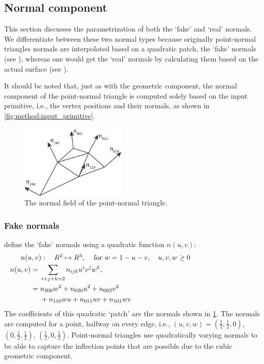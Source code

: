 
\subsection{Normal component}\label{ss:normal_component}
This section discusses the parametrization of both the `fake' and `real' normals. We differentiate between these two normal types because originally point-normal triangles normals are interpolated based on a quadratic patch, the `fake' normals (see ), whereas one would get the `real' normals by calculating them based on the actual surface (see ).

It should be noted that, just as with the geometric component, the normal component of the point-normal triangle is computed solely based on the input primitive, i.e., the vertex positions and their normals, as shown in \cref{fig:method:input_primitive}. 

\begin{figure}
	\centering
	\includegraphics[width=0.45\textwidth]{./content/img/method/normals.png}
	\caption{The normal field of the point-normal triangle.}
	\label{fig:method:normal_field}
\end{figure}

\subsubsection{Fake normals}
\label{sss:method:normals:fakeNormals}
	\citeauthor{vlachos2001curved} define the `fake' normals using a quadratic function $n(u,v)$:
	\begin{align}
	\noalign{$n(u,v): \quad R^2 \mapsto R^3,\quad$ for $w = 1 - u - v, \quad u, v, w \geq 0$}
	\begin{split}\label{eq:method:quadratic_normal_patch}
	    n(u,v) ={}& \sum_{i + j + k = 2} n_{ijk}u^i v^j w^k,\\
	      	   ={}& n_{200}w^2 + n_{020}u^2 + n_{002}v^2\\
	      	    {}& + n_{110}wu + n_{011}uv + n_{101}wv\\
	\end{split}
	\end{align}
	The coefficients of this quadratic `patch' are the normals shown in \cref{fig:method:normal_field}. The normals are computed for a point, halfway on every edge, i.e., $(u,v,w) = (\frac{1}{2}, \frac{1}{2}, 0)$, $(0, \frac{1}{2}, \frac{1}{2})$, $(\frac{1}{2}, 0, \frac{1}{2})$. Point-normal triangles use quadratically varying normals to be able to capture the inflection points that are possible due to the cubic geometric component. 

